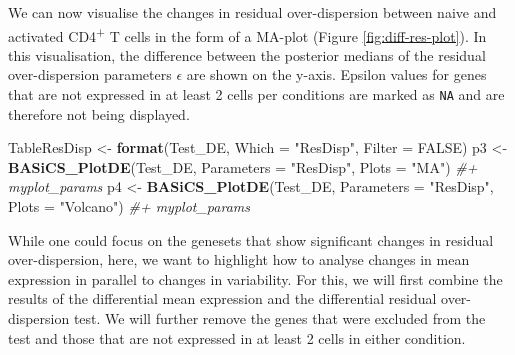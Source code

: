 \documentclass[9pt,a4paper,]{extarticle}
\newenvironment{Shaded}{\begin{snugshade}}{\end{snugshade}}
\newcommand{\CommentTok}[1]{\textcolor[rgb]{0.56,0.35,0.01}{\textit{#1}}}
\newcommand{\DataTypeTok}[1]{\textcolor[rgb]{0.13,0.29,0.53}{#1}}
\newcommand{\KeywordTok}[1]{\textcolor[rgb]{0.13,0.29,0.53}{\textbf{#1}}}
\newcommand{\NormalTok}[1]{#1}
\newcommand{\OperatorTok}[1]{\textcolor[rgb]{0.81,0.36,0.00}{\textbf{#1}}}
\newcommand{\OtherTok}[1]{\textcolor[rgb]{0.56,0.35,0.01}{#1}}
\newcommand{\StringTok}[1]{\textcolor[rgb]{0.31,0.60,0.02}{#1}}
\begin{document}
We can now visualise the changes in residual over-dispersion between naive and
activated CD4\textsuperscript{+} T cells in the form of a MA-plot
(Figure \ref{fig:diff-res-plot}).
In this visualisation, the difference between the posterior medians of the
residual over-dispersion parameters \(\epsilon\) are shown on the y-axis.
Epsilon values for genes that are not expressed in at least 2 cells per
conditions are marked as \texttt{NA} and are therefore not being displayed.

\begin{Shaded}
\begin{Highlighting}[]
\NormalTok{TableResDisp <-}\StringTok{ }\KeywordTok{format}\NormalTok{(Test_DE, }\DataTypeTok{Which =} \StringTok{"ResDisp"}\NormalTok{, }\DataTypeTok{Filter =} \OtherTok{FALSE}\NormalTok{)}
\NormalTok{p3 <-}\StringTok{ }\KeywordTok{BASiCS_PlotDE}\NormalTok{(Test_DE, }\DataTypeTok{Parameters =} \StringTok{"ResDisp"}\NormalTok{, }\DataTypeTok{Plots =} \StringTok{"MA"}\NormalTok{) }\CommentTok{#+ myplot_params}
\NormalTok{p4 <-}\StringTok{ }\KeywordTok{BASiCS_PlotDE}\NormalTok{(Test_DE, }\DataTypeTok{Parameters =} \StringTok{"ResDisp"}\NormalTok{, }\DataTypeTok{Plots =} \StringTok{"Volcano"}\NormalTok{) }\CommentTok{#+ myplot_params}
\end{Highlighting}
\end{Shaded}

While one could focus on the genesets that show significant changes in
residual over-dispersion, here, we want to highlight how to analyse
changes in mean expression in parallel to changes in variability.
For this, we will first combine the results of the differential mean expression
and the differential residual over-dispersion test.
We will further remove the genes that were excluded from the test and those
that are not expressed in at least 2 cells in either condition.

\begin{Shaded}
\end{Shaded}
\end{document}
